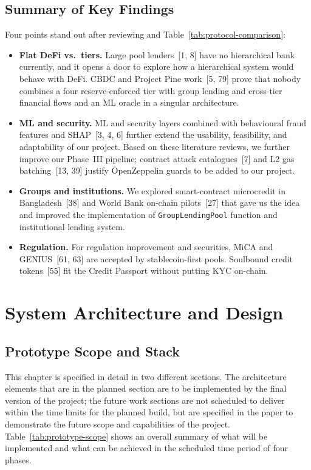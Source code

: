 \documentclass[12pt, a4paper]{report}
\begin{document}
\section{Summary of Key Findings}
\label{sec:lit-key-findings}

Four points stand out after reviewing and Table~\ref{tab:protocol-comparison}:

\begin{itemize}[noitemsep]
\item \textbf{Flat DeFi vs.\ tiers.} Large pool lenders~[1, 8] have no hierarchical bank currently, and it opens a door to explore how a hierarchical system would behave with DeFi. CBDC and Project Pine work~[5, 79] prove that nobody combines a four reserve-enforced tier with group lending and cross-tier financial flows and an ML oracle in a singular architecture.
\item \textbf{ML and security.} ML and security layers combined with behavioural fraud features and SHAP~[3, 4, 6] further extend the usability, feasibility, and adaptability of our project. Based on these literature reviews, we further improve our Phase~III pipeline; contract attack catalogues~[7] and L2 gas batching~[13, 39] justify OpenZeppelin guards to be added to our project.
\item \textbf{Groups and institutions.} We explored smart-contract microcredit in Bangladesh~[38] and World Bank on-chain pilots~[27] that gave us the idea and improved the implementation of \texttt{GroupLendingPool} function and institutional lending system.
\item \textbf{Regulation.} For regulation improvement and securities, MiCA and GENIUS~[61, 63] are accepted by stablecoin-first pools. Soulbound credit tokens~[55] fit the Credit Passport without putting KYC on-chain.
\end{itemize}

\chapter{System Architecture and Design}
\label{ch:architecture-compressed}

\section{Prototype Scope and Stack}
\label{sec:prototype-scope}

This chapter is specified in detail in two different sections. The architecture elements that are in the planned section are to be implemented by the final version of the project; the future work sections are not scheduled to deliver within the time limits for the planned build, but are specified in the paper to demonstrate the future scope and capabilities of the project. Table~\ref{tab:prototype-scope} shows an overall summary of what will be implemented and what can be achieved in the scheduled time period of four phases.
\end{document}
